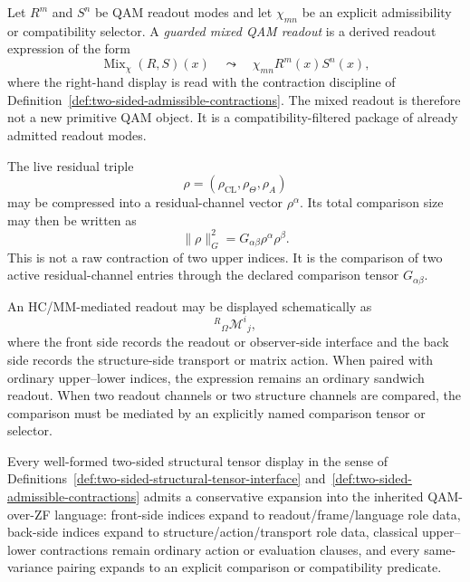 \begin{definition}\label{def:guarded-two-sided-mixed-qam-readout}
Let \(R^m\) and \(S^n\) be QAM readout modes and let \(\chi_{mn}\) be an explicit admissibility or compatibility selector. A \emph{guarded mixed QAM readout} is a derived readout expression of the form
\[
\operatorname{Mix}_{\chi}(R,S)(x)
\quad\leadsto\quad
\chi_{mn}R^m(x)S^n(x),
\]
where the right-hand display is read with the contraction discipline of Definition~\ref{def:two-sided-admissible-contractions}. The mixed readout is therefore not a new primitive QAM object. It is a compatibility-filtered package of already admitted readout modes.
\end{definition}

\begin{remark}\label{ex:two-sided-residual-comparison}
The live residual triple
\[
\rho=(\rho_{\mathrm{CL}},\rho_{\Theta},\rho_A)
\]
may be compressed into a residual-channel vector \(\rho^\alpha\). Its total comparison size may then be written as
\[
\|\rho\|_G^2=G_{\alpha\beta}\rho^\alpha\rho^\beta .
\]
This is not a raw contraction of two upper indices. It is the comparison of two active residual-channel entries through the declared comparison tensor \(G_{\alpha\beta}\).
\end{remark}

\begin{remark}\label{ex:two-sided-hc-mm-sandwich}
An HC/MM-mediated readout may be displayed schematically as
\[
{}^{R}{}_{\Omega}\mathcal{M}^{i}{}_{j},
\]
where the front side records the readout or observer-side interface and the back side records the structure-side transport or matrix action. When paired with ordinary upper--lower indices, the expression remains an ordinary sandwich readout. When two readout channels or two structure channels are compared, the comparison must be mediated by an explicitly named comparison tensor or selector.
\end{remark}

\begin{proposition}\label{prop:two-sided-conservative-expansion}
Every well-formed two-sided structural tensor display in the sense of Definitions~\ref{def:two-sided-structural-tensor-interface} and~\ref{def:two-sided-admissible-contractions} admits a conservative expansion into the inherited QAM-over-ZF language: front-side indices expand to readout/frame/language role data, back-side indices expand to structure/action/transport role data, classical upper--lower contractions remain ordinary action or evaluation clauses, and every same-variance pairing expands to an explicit comparison or compatibility predicate.
\end{proposition}

